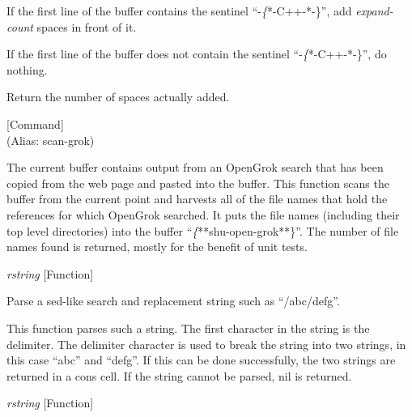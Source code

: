 \begin{doc-string}
If the first line of the buffer contains the sentinel ``-\emph\{*-C++-*-\}'', add
\emph{expand-count} spaces in front of it.

If the first line of the buffer does not contain the sentinel ``-\emph\{*-C++-*-\}'',
do nothing.

Return the number of spaces actually added.
\end{doc-string}

\vspace{1em}
\noindent
{}
\usebox{\funcname}
 \hfill [Command]\\%
 (Alias: scan-grok)

\begin{doc-string}
The current buffer contains output from an OpenGrok search that has been
copied from the web page and pasted into the buffer.  This function scans the
buffer from the current point and harvests all of the file names that hold the
references for which OpenGrok searched.  It puts the file names (including their
top level directories) into the buffer ``\emph\{**shu-open-grok**\}''.
The number of file names found is returned, mostly for the benefit of unit
tests.
\end{doc-string}

\vspace{1em}
\noindent
{}
\usebox{\funcname}\emph{rstring}
 \hfill [Function]

\begin{doc-string}
Parse a sed-like search and replacement string such as ``/abc/defg''.

This function parses such a string.  The first character in the string is the
delimiter.  The delimiter character is used to break the string into two
strings, in this case ``abc'' and ``defg''.  If this can be done successfully,
the two strings are returned in a cons cell.  If the string cannot be parsed,
nil is returned.
\end{doc-string}

\vspace{1em}
\noindent
{}
\usebox{\funcname}\emph{rstring}
 \hfill [Function]

